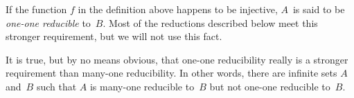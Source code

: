 \documentclass[../../../include/open-logic-section]{subfiles}
\begin{document}
If the function $f$ in the definition above happens to be injective,
$A$~is said to be \emph{one-one reducible} to~$B$. Most of the
reductions described below meet this stronger requirement, but we will
not use this fact.

\begin{digress}
It is true, but by no means obvious, that one-one reducibility really
is a stronger requirement than many-one reducibility. In other words,
there are infinite sets $A$ and~$B$ such that $A$ is many-one
reducible to~$B$ but not one-one reducible to~$B$.
\end{digress}
\end{document}

